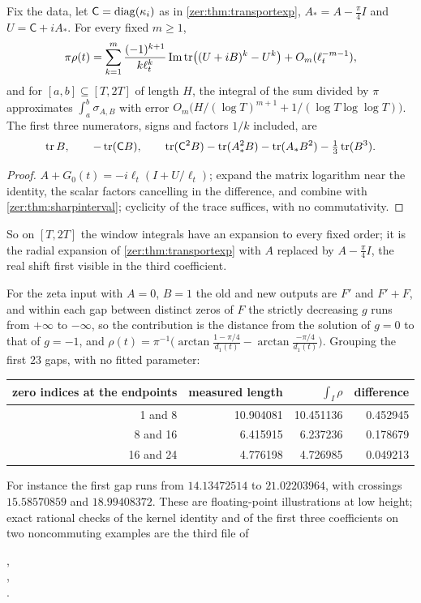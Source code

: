 \begin{corollary}\label{zer:cor:sharpexp}
Fix the data, let $\mathsf C=\operatorname{diag}(\kappa_i)$ as in \cref{zer:thm:transportexp}, $A_*=A-\tfrac\pi4I$ and
$U=\mathsf C+iA_*$. For every fixed $m\ge1$,
\[
 \pi\rho(t)=\sum_{k=1}^m\frac{(-1)^{k+1}}{k\ell_t^k}\operatorname{Im}\operatorname{tr}\bigl((U+iB)^k-U^k\bigr)+O_m(\ell_t^{-m-1}),
\]
and for $[a,b]\subseteq[T,2T]$ of length $H$, the integral of the sum divided by $\pi$ approximates
$\int_a^b\sigma_{A,B}$ with error $O_m\bigl(H/(\log T)^{m+1}+1/(\log T\log\log T)\bigr)$. The first three
numerators, signs and factors $1/k$ included, are
\[
 \operatorname{tr} B,\qquad-\operatorname{tr}(\mathsf CB),\qquad\operatorname{tr}(\mathsf C^2B)-\operatorname{tr}(A_*^2B)-\operatorname{tr}(A_*B^2)-\tfrac13\operatorname{tr}(B^3).
\]
\end{corollary}
\begin{proof}
$A+G_0(t)=-i\ell_t(I+U/\ell_t)$; expand the matrix logarithm near the identity, the scalar factors cancelling
in the difference, and combine with \cref{zer:thm:sharpinterval}; cyclicity of the trace suffices, with no
commutativity.
\end{proof}

So on $[T,2T]$ the window integrals have an expansion to every fixed order; it is the radial expansion of
\cref{zer:thm:transportexp} with $A$ replaced by $A-\tfrac\pi4I$, the real shift first visible in the third
coefficient.

For the zeta input with $A=0$, $B=1$ the old and new outputs are $F'$ and $F'+F$, and within each gap between
distinct zeros of $F$ the strictly decreasing $g$ runs from $+\infty$ to $-\infty$, so the contribution is the
distance from the solution of $g=0$ to that of $g=-1$, and
$\rho(t)=\pi^{-1}\bigl(\arctan\frac{1-\pi/4}{d_1(t)}-\arctan\frac{-\pi/4}{d_1(t)}\bigr)$. Grouping the first $23$ gaps,
with no fitted parameter:
\begin{center}\small
\begin{tabular}{rrrr}
\toprule
zero indices at the endpoints&measured length&$\int_I\rho$&difference\\\midrule
1 and 8&10.904081&10.451136&0.452945\\
8 and 16&6.415915&6.237236&0.178679\\
16 and 24&4.776198&4.726985&0.049213\\
\bottomrule
\end{tabular}
\end{center}
For instance the first gap runs from $14.13472514$ to $21.02203964$, with crossings $15.58570859$ and
$18.99408372$. These are floating-point illustrations at low height; exact rational checks of the kernel
identity and of the first three coefficients on two noncommuting examples are the third file of
\begin{center},\\
,\\
.\end{center}

